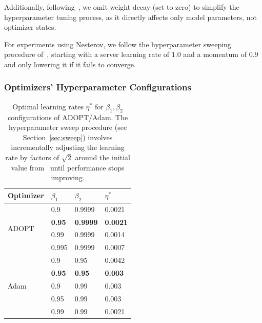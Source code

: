 \documentclass{article}
\begin{document}
Additionally, following~\citet{zhang2025critical}, we omit weight decay (set to zero) to simplify the hyperparameter tuning process, as it directly affects only model parameters, not optimizer states.

For experiments using Nesterov, we follow the hyperparameter sweeping procedure of~\citet{charles2025communication}, starting with a server learning rate of $1.0$ and a momentum of $0.9$ and only lowering it if it fails to converge.

\subsubsection{Optimizers' Hyperparameter Configurations}
\label{sec:hp_configs}

\begin{table}[h]
\centering
\caption{Optimal learning rates $\eta^*$ for $\beta_1, \beta_2$ configurations of ADOPT/Adam. The hyperparameter sweep procedure (see Section~\ref{sec:sweep}) involves incrementally adjusting the learning rate by factors of $\sqrt{2}$ around the initial value from~\citet{allal2025smollm2} until performance stops improving.}
\label{tab:lr_sweep}
\begin{tabular}{llll}
\toprule
Optimizer & $\beta_1$ & $\beta_2$ & $\eta^*$ \\
\midrule
\multirow{4}{*}{ADOPT} & 0.9   & 0.9999 & 0.0021 \\
                        & \textbf{0.95}  & \textbf{0.9999} & \textbf{0.0021} \\
                        & 0.99  & 0.9999 & 0.0014 \\
                        & 0.995 & 0.9999 & 0.0007 \\
\midrule
\multirow{5}{*}{Adam}  & 0.9   & 0.95   & 0.0042 \\
                        & \textbf{0.95}  & \textbf{0.95}   & \textbf{0.003}  \\
                        & 0.9   & 0.99   & 0.003  \\
                        & 0.95  & 0.99   & 0.003  \\
                        & 0.99  & 0.99   & 0.0021 \\
\bottomrule
\end{tabular}
\end{table}
\end{document}
